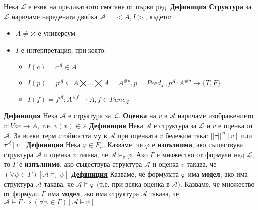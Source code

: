 \documentclass{article}
\begin{document}
Нека $\mathcal{L}$ е език на предикатното смятане от първи ред. \newline\newline
\textbf{\underline{Дефиниция}}
\textbf{Структура} за $\mathcal{L}$ наричаме наредената двойка
$\mathcal{A} = <A, I>$, където:
\begin{itemize}
    \item $A \neq \varnothing$ е универсум
    \item $I$ е интерпретация, при която:
    \begin{itemize}
        \item $I(c) = c^{\mathcal{A}} \in A$
        \item $I(p) = p^{\mathcal{A}} \subseteq A \bigtimes ... \bigtimes A = A^{\#p}, p = Pred_{\mathcal{L}}, p^{\mathcal{A}}
        : A^{\#p} \rightarrow \{T, F\}$
        \item $I(f) = f^{\mathcal{A}} : A^{\#f} \rightarrow A, f \in Func_{\mathcal{L}} $
    \end{itemize}
\end{itemize}
\textbf{\underline{Дефиниция}}
Нека $\mathcal{A}$ е структура за $\mathcal{L}$. \textbf{Оценка} на $v$ в $\mathcal{A}$ наричаме изображението $v : Var
\rightarrow A$, т.е. $v(x) \in A$ \newline\newline
\textbf{\underline{Дефиниция}}
Нека $\mathcal{A}$ е структура за $\mathcal{L}$ и $v$ е оценка от $\mathcal{A}$. За всеки терм стойността му в $\mathcal{A}$
при оценката $v$ бележим така: $||\tau||^{\mathcal{A}}[v]$ или $\tau^{\mathcal{A}}[v]$ \newline\newline
\textbf{\underline{Дефиниция}}
Нека $\varphi \in F_{\alpha}$. Казваме, че $\varphi$ е \textbf{изпълнима}, ако съществува структура $\mathcal{A}$ и оценка $v$
такава, че $\mathcal{A} \models_v \varphi$. Ако $\Gamma$ е множество от формули над $\mathcal{L}$, то $\Gamma$ е \textbf{изпълнимо},
ако съществува структура $\mathcal{A}$ и оценка $v$ такава, че $(\forall \psi \in \Gamma)[\mathcal{A} \models_{v} \psi]$ \newline\newline
\textbf{\underline{Дефиниция}}
Казваме, че формулата $\varphi$ има \textbf{модел}, ако има структура $\mathcal{A}$ такава, че $\mathcal{A} \models \varphi$
(т.е. при всяка оценка в $\mathcal{A}$). Казваме, че множество от формули $\Gamma$ има \textbf{модел}, ако има структура
$\mathcal{A}$ такава, че $\mathcal{A} \models \Gamma \iff (\forall \psi \in \Gamma)[\mathcal{A} \models \psi]$ \newline\newline
\end{document}
